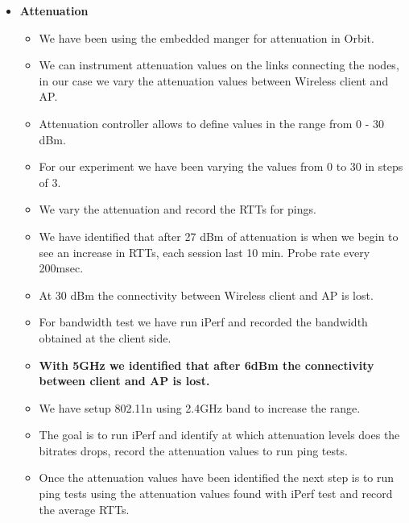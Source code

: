 \begin{itemize}
	\item \textbf{Attenuation}
	\begin{itemize}
		\item We have been using the embedded manger for attenuation in Orbit.
		\item We can instrument attenuation values on the links connecting the nodes, in our case we vary the attenuation values between Wireless client and AP.
		\item Attenuation controller allows to define values in the range from 0 - 30 dBm.
		\item For our experiment we have been varying the values from 0 to 30 in steps of 3.
		\item We vary the attenuation and record the RTTs for pings.
		\item We have identified that after 27 dBm of attenuation is when we begin to see an increase in RTTs, each session last 10 min. Probe rate every 200msec.
		\item At 30 dBm the connectivity between Wireless client and AP is lost.
		\item For bandwidth test we have run iPerf and recorded the bandwidth obtained at the client side.
		\item \textbf{With 5GHz we identified that after 6dBm the connectivity between client and AP is lost.}
		\item We have setup 802.11n using 2.4GHz band to increase the range.
		\item The goal is to run iPerf and identify at which attenuation levels does the bitrates drops, record the attenuation values to run ping tests.
		\item Once the attenuation values have been identified the next step is to run ping tests using the attenuation values found with iPerf test and record the average RTTs.
		
	\end{itemize}

	

\end{itemize}
